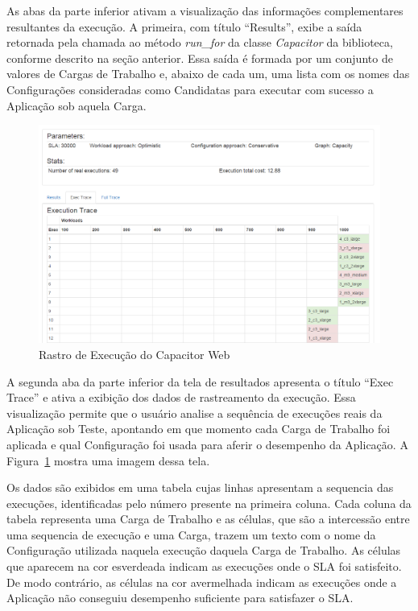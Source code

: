 As abas da parte inferior ativam a visualização das informações complementares 
resultantes da execução. A primeira, com título ``Results'', exibe a saída 
retornada pela chamada ao método \emph{run\_for} da classe \emph{Capacitor} da 
biblioteca, conforme descrito na seção anterior. Essa saída é formada por um 
conjunto de valores de Cargas de Trabalho e, abaixo de cada um, uma lista com os 
nomes das Configurações consideradas como Candidatas para executar com sucesso a 
Aplicação sob aquela Carga.  

\begin{figure}[htb]
  \caption{\label{fig:capacitor_web_trace}Rastro de Execução do Capacitor Web}
  \begin{center}
    \includegraphics[scale=0.45]{img/CapacitorWeb_ExecutionTrace}
  \end{center}
\end{figure}

A segunda aba da parte inferior da tela de resultados apresenta o título 
``Exec Trace'' e ativa a exibição dos dados de rastreamento da execução. Essa
visualização permite que o usuário analise a sequência de execuções reais da 
Aplicação sob Teste, apontando em que momento cada Carga de Trabalho foi aplicada
e qual Configuração foi usada para aferir o desempenho da Aplicação. A 
Figura~\ref{fig:capacitor_web_trace} mostra uma imagem dessa tela.

Os dados são exibidos em uma tabela cujas linhas apresentam a sequencia das 
execuções, identificadas pelo número presente na primeira coluna. Cada coluna da
tabela representa uma Carga de Trabalho e as células, que são a intercessão entre
uma sequencia de execução e uma Carga, trazem um texto com o nome da Configuração 
utilizada naquela execução daquela Carga de Trabalho. As células que aparecem na 
cor esverdeada indicam as execuções onde o SLA foi satisfeito. De modo contrário, 
as células na cor avermelhada indicam as execuções onde a Aplicação não conseguiu 
desempenho suficiente para satisfazer o SLA.
 
